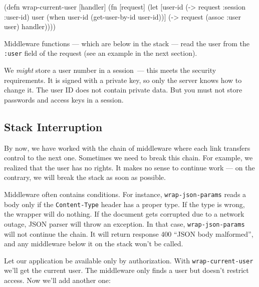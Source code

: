 \else

\begin{english}
  \begin{clojure}
(defn wrap-current-user [handler]
  (fn [request]
    (let [user-id (-> request :session :user-id)
          user (when user-id
                 (get-user-by-id user-id))]
      (-> request
          (assoc :user user)
          handler))))
  \end{clojure}
\end{english}

\fi


Middleware functions — which are below in the stack — read the user from the \verb|:user| field of the request (see an example in the next section).

We \emph{might} store a user number in a session~--- this meets the security requirements. It is signed with a private key, so only the server knows how to change it. The user ID does not contain private data. But you must not store passwords and access keys in a session.

\subsection{Stack Interruption}


By now, we have worked with the chain of middleware where each link transfers control to the next one. Sometimes we need to break this chain. For example, we realized that the user has no rights. It makes no sense to continue work — on the contrary, we will break the stack as soon as possible.


Middleware often contains conditions. For instance, \verb|wrap-json-params| reads a body only if the \verb|Content-Type| header has a proper type. If the type is wrong, the wrapper will do nothing. If the document gets corrupted due to a network outage, JSON parser will throw an exception. In that case, \verb|wrap-json-params| will not continue the chain. It will return response 400 ``JSON body malformed'', and any middleware below it on the stack won't be called.

Let our application be available only by authorization. With \verb|wrap-current-user| we'll get the current user. The middleware only finds a user but doesn't restrict access. Now we'll add another one:

